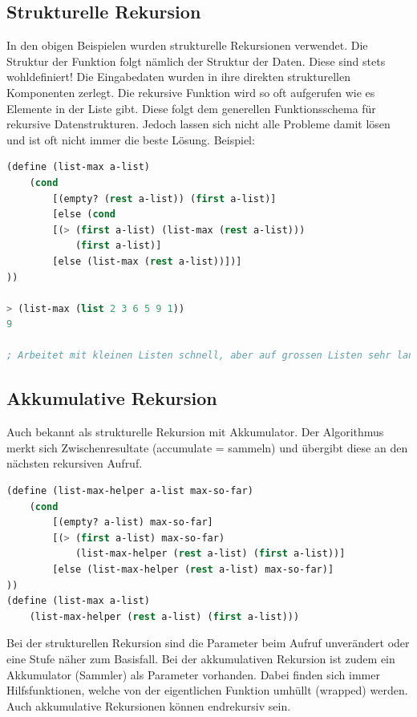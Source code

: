 \subsection{Strukturelle Rekursion}
In den obigen Beispielen wurden strukturelle Rekursionen verwendet. Die Struktur der Funktion folgt nämlich der Struktur der Daten. Diese sind stets wohldefiniert! Die Eingabedaten wurden in ihre direkten strukturellen Komponenten zerlegt. Die rekursive Funktion wird so oft aufgerufen wie es Elemente in der Liste gibt. Diese folgt dem generellen Funktionsschema für rekursive Datenstrukturen. Jedoch lassen sich nicht alle Probleme damit lösen und ist oft nicht immer die beste Lösung. Beispiel:

\begin{lstlisting}[language=Lisp, caption=Strukturelle Rekursion - Beispiel Maximumssuche]
(define (list-max a-list)
	(cond
		[(empty? (rest a-list)) (first a-list)]
		[else (cond
		[(> (first a-list) (list-max (rest a-list)))
			(first a-list)]
		[else (list-max (rest a-list))])]
))

> (list-max (list 2 3 6 5 9 1))
9

; Arbeitet mit kleinen Listen schnell, aber auf grossen Listen sehr langsam. Das Problem ist, dass die Lösung zwei Rekursionen hat - die Rekursionsaufrufe verdoppeln sich!
\end{lstlisting}

\subsection{Akkumulative Rekursion}
Auch bekannt als strukturelle Rekursion mit Akkumulator. Der Algorithmus merkt sich Zwischenresultate (accumulate = sammeln) und übergibt diese an den nächsten rekursiven Aufruf.

\begin{lstlisting}[language=Lisp, caption=Akkumulative Rekursion - Beispiel Maximumssuche]
(define (list-max-helper a-list max-so-far)
	(cond
		[(empty? a-list) max-so-far]
		[(> (first a-list) max-so-far)
			(list-max-helper (rest a-list) (first a-list))]
		[else (list-max-helper (rest a-list) max-so-far)]
))
(define (list-max a-list)
	(list-max-helper (rest a-list) (first a-list)))
\end{lstlisting}

Bei der strukturellen Rekursion sind die Parameter beim Aufruf unverändert oder eine Stufe näher zum Basisfall. Bei der akkumulativen Rekursion ist zudem ein Akkumulator (Sammler) als Parameter vorhanden. Dabei finden sich immer Hilfsfunktionen, welche von der eigentlichen Funktion umhüllt (wrapped) werden. Auch akkumulative Rekursionen können endrekursiv sein.

